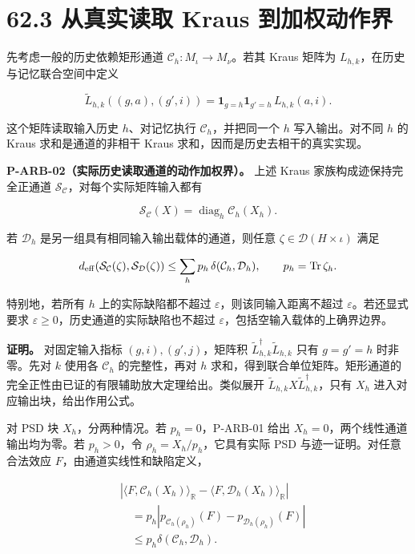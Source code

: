 \documentclass[
  11pt,
  oneside]{book}
\begin{document}
\section{62.3 从真实读取 Kraus 到加权动作界}

先考虑一般的历史依赖矩形通道 \(\mathcal C_h:M_\iota\to M_\nu\)。若其
Kraus 矩阵为 \(L_{h,k}\)，在历史与记忆联合空间中定义

\[
\widetilde L_{h,k}((g,a),(g',i))
=\mathbf 1_{g=h}\mathbf 1_{g'=h}\,L_{h,k}(a,i).
\]

这个矩阵读取输入历史 \(h\)、对记忆执行 \(\mathcal C_h\)，并把同一个
\(h\) 写入输出。对不同 \(h\) 的 Kraus 求和是通道的非相干 Kraus
求和，因而是历史去相干的真实实现。

\protect\hypertarget{p-arb-02}{}{}

\textbf{P-ARB-02（实际历史读取通道的动作加权界）。} 上述 Kraus
家族构成迹保持完全正通道
\(\mathcal S_{\mathcal C}\)，对每个实际矩阵输入都有

\[
\mathcal S_{\mathcal C}(X)
=\operatorname{diag}_h\mathcal C_h(X_h).
\]

若 \(\mathcal D_h\) 是另一组具有相同输入输出载体的通道，则任意
\(\zeta\in\mathcal D(H\times\iota)\) 满足

\[
d_{\rm eff}(\mathcal S_{\mathcal C}(\zeta),
             \mathcal S_{\mathcal D}(\zeta))
\le \sum_h p_h\,\delta(\mathcal C_h,\mathcal D_h),
\qquad p_h=\operatorname{Tr}\zeta_h.
\]

特别地，若所有 \(h\) 上的实际缺陷都不超过
\(\varepsilon\)，则该同输入距离不超过 \(\varepsilon\)。若还显式要求
\(\varepsilon\ge0\)，历史通道的实际缺陷也不超过
\(\varepsilon\)，包括空输入载体的上确界边界。

\textbf{证明。} 对固定输入指标 \((g,i),(g',j)\)，矩阵积
\(\widetilde L_{h,k}^\dagger\widetilde L_{h,k}\) 只有 \(g=g'=h\)
时非零。先对 \(k\) 使用各 \(\mathcal C_h\) 的完整性，再对 \(h\)
求和，得到联合单位矩阵。矩形通道的完全正性由已证的有限辅助放大定理给出。类似展开
\(\widetilde L_{h,k}X\widetilde L_{h,k}^\dagger\)，只有 \(X_h\)
进入对应输出块，给出作用公式。

对 PSD 块 \(X_h\)，分两种情况。若 \(p_h=0\)，P-ARB-01 给出
\(X_h=0\)，两个线性通道输出均为零。若 \(p_h>0\)，令
\(\rho_h=X_h/p_h\)，它具有实际 PSD 与迹一证明。对任意合法效应
\(F\)，由通道实线性和缺陷定义，

\[
\begin{aligned}
&\left|\langle F,\mathcal C_h(X_h)\rangle_{\mathbb R}
 -\langle F,\mathcal D_h(X_h)\rangle_{\mathbb R}\right|\\
&\quad=p_h\left|p_{\mathcal C_h(\rho_h)}(F)
                 -p_{\mathcal D_h(\rho_h)}(F)\right|\\
&\quad\le p_h\delta(\mathcal C_h,\mathcal D_h).
\end{aligned}
\]
\end{document}
